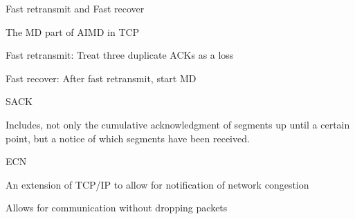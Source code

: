 \documentclass[main.tex]{subfiles}
\begin{document}
\begin{card}{Fast retransmit and Fast recover}
\item The MD part of AIMD in TCP
\item Fast retransmit: Treat three duplicate ACKs as a loss
\item Fast recover: After fast retransmit, start MD
\end{card}

\begin{card}{SACK}
\item Includes, not only the cumulative acknowledgment of segments up until a certain point, but a notice of which segments have been received.
\end{card}

\begin{card}{ECN}
\item An extension of TCP/IP to allow for notification of network congestion
\item Allows for communication without dropping packets
\end{card}
\end{document}
